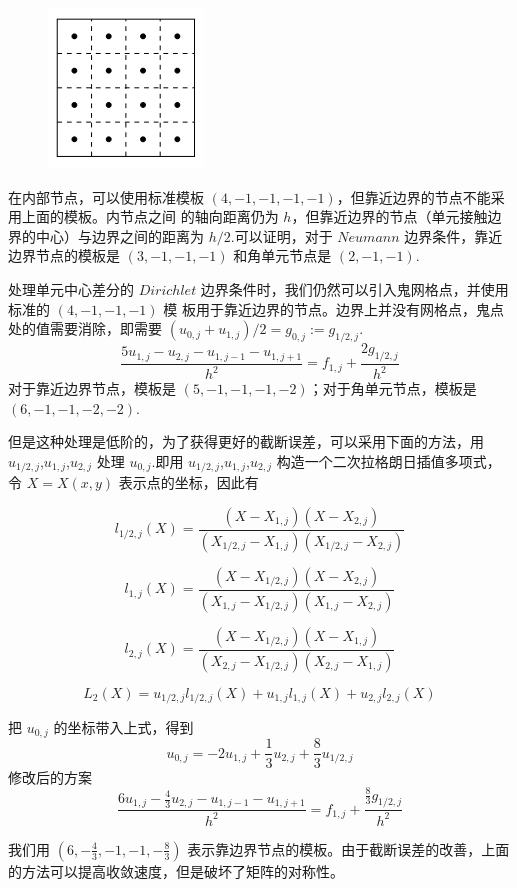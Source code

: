 \documentclass[12pt,a4paper]{article}
\begin{document}
\begin{figure}[H]
\centering
\includegraphics[scale=0.5]{./figures/1.png}
\caption{}
\end{figure}

在内部节点，可以使用标准模板 $(4,−1,−1,−1,−1)$，但靠近边界的节点不能采用上面的模板。内节点之间
的轴向距离仍为 $h$，但靠近边界的节点（单元接触边界的中心）与边界之间的距离为 $h/2$.可以证明，对于 $Neumann$ 边界条件，靠近边界节点的模板是 $(3,−1,−1,−1)$ 和角单元节点是 $(2,−1,−1)$.

处理单元中心差分的 $Dirichlet$ 边界条件时，我们仍然可以引入鬼网格点，并使用标准的 $(4,−1,−1,−1)$ 模
板用于靠近边界的节点。边界上并没有网格点，鬼点处的值需要消除，即需要 $(u_{0,j}+u_{1,j})/2=g_{0,j}:=g_{1/2,j}$.
$$
\frac{5u_{1,j}-u_{2,j}-u_{1,j-1}-u_{1,j+1}}{h^2}=f_{1,j}+\frac{2g_{1/2,j}}{h^2}
$$
对于靠近边界节点，模板是 $(5,-1,-1,-1,-2)$；对于角单元节点，模板是 $(6,-1,-1,-2,-2)$.

但是这种处理是低阶的，为了获得更好的截断误差，可以采用下面的方法，用 $u_{1/2,j}$,$u_{1,j}$,$u_{2,j}$ 处理 $u_{0,j}$.即用 $u_{1/2,j}$,$u_{1,j}$,$u_{2,j}$ 构造一个二次拉格朗日插值多项式，令 $X=X(x,y)$ 表示点的坐标，因此有

$$
l_{1/2,j}(X)=\frac{(X-X_{1,j})(X-X_{2,j})}{(X_{1/2,j}-X_{1,j})(X_{1/2,j}-X_{2,j})}
$$

$$
l_{1,j}(X)=\frac{(X-X_{1/2,j})(X-X_{2,j})}{(X_{1,j}-X_{1/2,j})(X_{1,j}-X_{2,j})}
$$

$$
l_{2,j}(X)=\frac{(X-X_{1/2,j})(X-X_{1,j})}{(X_{2,j}-X_{1/2,j})(X_{2,j}-X_{1,j})}
$$


$$
L_2(X)=u_{1/2,j} l_{1/2,j}(X)+u_{1,j} l_{1,j}(X)+u_{2,j} l_{2,j}(X)
$$

把 $u_{0,j}$ 的坐标带入上式，得到
$$
u_{0,j}=-2u_{1,j}+\frac{1}{3}u_{2,j}+\frac{8}{3}u_{1/2,j}
$$
修改后的方案
$$
\frac{ 6u_{1,j}-\frac{4}{3}u_{2,j}-u_{1,j-1}-u_{1,j+1} }{h^2}=f_{1,j}+\frac{ \frac{8}{3} g_{1/2,j} }{h^2}
$$

我们用 $(6,−\frac{4}{3},−1,−1,−\frac{8}{3})$ 表示靠边界节点的模板。由于截断误差的改善，上面的方法可以提高收敛速度，但是破坏了矩阵的对称性。
\end{document}
